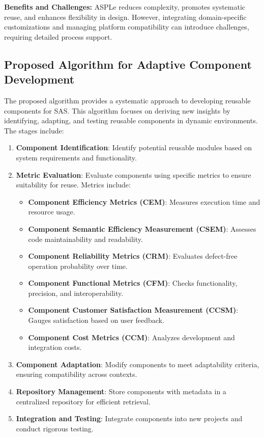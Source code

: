 \documentclass[a4paper,10pt]{article}
\begin{document}
\textbf{Benefits and Challenges:} ASPLe reduces complexity, promotes systematic reuse, and enhances flexibility in design. However, integrating domain-specific customizations and managing platform compatibility can introduce challenges, requiring detailed process support.

\subsection{Proposed Algorithm for Adaptive Component Development}

The proposed algorithm provides a systematic approach to developing reusable components for SAS. This algorithm focuses on deriving new insights by identifying, adapting, and testing reusable components in dynamic environments. The stages include:

\begin{enumerate}
    \item \textbf{Component Identification}: Identify potential reusable modules based on system requirements and functionality.
    \item \textbf{Metric Evaluation}: Evaluate components using specific metrics to ensure suitability for reuse. Metrics include:
        \begin{itemize}
            \item \textbf{Component Efficiency Metrics (CEM)}: Measures execution time and resource usage.
            \item \textbf{Component Semantic Efficiency Measurement (CSEM)}: Assesses code maintainability and readability.
            \item \textbf{Component Reliability Metrics (CRM)}: Evaluates defect-free operation probability over time.
            \item \textbf{Component Functional Metrics (CFM)}: Checks functionality, precision, and interoperability.
            \item \textbf{Component Customer Satisfaction Measurement (CCSM)}: Gauges satisfaction based on user feedback.
            \item \textbf{Component Cost Metrics (CCM)}: Analyzes development and integration costs.
        \end{itemize}
    \item \textbf{Component Adaptation}: Modify components to meet adaptability criteria, ensuring compatibility across contexts.
    \item \textbf{Repository Management}: Store components with metadata in a centralized repository for efficient retrieval.
    \item \textbf{Integration and Testing}: Integrate components into new projects and conduct rigorous testing.
\end{enumerate}
\end{document}
